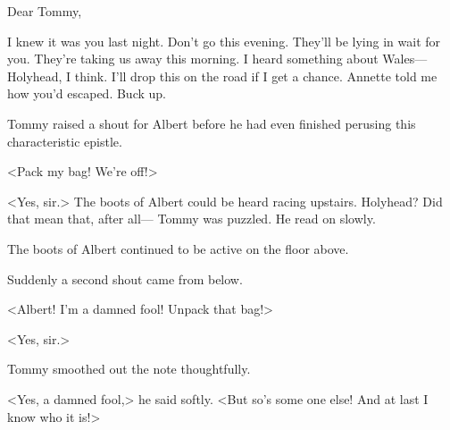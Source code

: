 \begin{mail}{}{Dear Tommy,}

I knew it was you last night. Don't go this evening. They'll be lying in wait for you. They're taking us away this morning. I heard something about Wales—Holyhead, I think. I'll drop this on the road if I get a chance. Annette told me how you'd escaped. Buck up.

\end{mail}

Tommy raised a shout for Albert before he had even finished perusing this characteristic epistle.

<Pack my bag! We're off!>

<Yes, sir.> The boots of Albert could be heard racing upstairs. Holyhead? Did that mean that, after all— Tommy was puzzled. He read on slowly.

The boots of Albert continued to be active on the floor above.

Suddenly a second shout came from below.

<Albert! I'm a damned fool! Unpack that bag!>

<Yes, sir.>

Tommy smoothed out the note thoughtfully.

<Yes, a damned fool,> he said softly. <But so's some one else! And at last I know who it is!> 